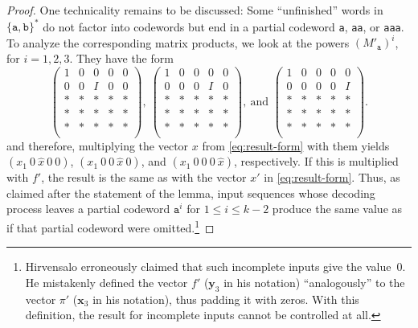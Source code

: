 \documentclass[a4paper,cleveref, autoref, thm-restate]{lipics-v2021}
\begin{document}
\begin{proof}
One technicality remains to be discussed: Some  ``unfinished'' words in
$\{\mathtt{a},\mathtt{b}\}^*$  do not factor into codewords but
end in a partial
codeword \texttt{a}, \texttt{aa}, or \texttt{aaa}.
To analyze the corresponding matrix products, we look at the powers
$(M'_{\mathtt{a}})^i$, for $i=1,2,3$.
They have the form
\begin{equation}\label{eq:form-MaMa}
  \begin{pmatrix}
  1&  0 & 0 & 0 & 0\\
   0 & 0 & I & 0& 0\\
    * & * & * & *& *\\
    * & * & * & *& *\\
    * & * & * & *& *\\
  \end{pmatrix},\
  \begin{pmatrix}
  1&  0 & 0 & 0 & 0\\
   0 & 0 & 0& I & 0\\
    * & * & * & *& *\\
    * & * & * & *& *\\
    * & * & * & *& *\\
  \end{pmatrix},\
  \text{and }
  \begin{pmatrix}
  1&  0 & 0 & 0 & 0\\
   0 & 0 & 0& 0 & I\\
    * & * & * & *& *\\
    * & * & * & *& *\\
    * & * & * & *& *\\
  \end{pmatrix}.  
\end{equation}
and therefore, multiplying
 the vector $x$ from \eqref{eq:result-form} with them
yields
$ (x_1\ 0 \ \hat x\ 0\ 0)$,
$ (x_1\ 0\ 0 \ \hat x\  0)$, and
$ (x_1\ 0 \ 0 \ 0\ \hat x)$,
respectively.
If this is multiplied with $f'$, the result is the same as with
 the vector $x'$ in \eqref{eq:result-form}. %
Thus, as claimed after the statement of the lemma, {input sequences whose decoding process leaves
  a partial codeword $\mathtt{a}^i$ for $1\le i \le k-2$
  produce the same value
as if that partial codeword were omitted}.\footnote
 {Hirvensalo
  \cite%
  {hirvensalo07} erroneously claimed that such
  incomplete inputs %
  give the value~0.
He mistakenly defined the vector $f'$ ($\mathbf{y}_3$ in his notation)
``analogously''
to the vector $\pi'$ ($\mathbf{x}_3$ in his notation),
thus padding it with zeros.
With this
definition, the result for incomplete inputs cannot be controlled at all.
}
  \end{proof}
\end{document}
